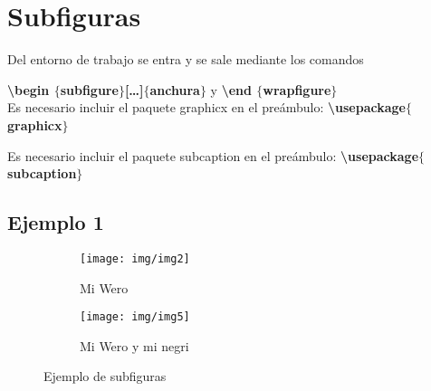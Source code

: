 \documentclass[11pt,letterpaper]{article}
\begin{document}
	\newpage
	\section{Subfiguras}
	
	Del entorno de trabajo se entra y se sale mediante los comandos
	
	 \textbf{\textbackslash begin $\lbrace$subfigure$\rbrace$[\dots]$\lbrace$anchura$\rbrace$} y \textbf{\textbackslash end $\lbrace$wrapfigure$\rbrace$} \\
	 
	Es necesario incluir el paquete graphicx en el preámbulo: \textbf{\textbackslash 			usepackage$\lbrace$graphicx$\rbrace$} 
	 
	Es necesario incluir el paquete subcaption en el preámbulo: \textbf{\textbackslash 			usepackage$\lbrace$subcaption$\rbrace$} \\
	 
	\subsection{Ejemplo 1}
	 \begin{figure}[h]
		\centering
		\begin{subfigure}{6cm}
			\texttt{[image: img/img2]}
			\caption{Mi Wero}
		\end{subfigure}
		\begin{subfigure}{6cm}
			\texttt{[image: img/img5]}
			\caption{Mi Wero y mi negri}
		\end{subfigure}
		\caption{Ejemplo de subfiguras}
	\end{figure}
	
\end{document}
